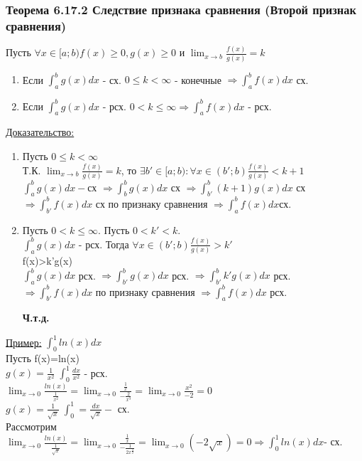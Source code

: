 \documentclass[12pt]{article}
\begin{document}
    \subsubsection*{Теорема 6.17.2 Следствие признака сравнения (Второй признак сравнения)}\label{th:}
    Пусть $\forall x \in [a;b) f(x)\geq 0,g(x)\geq 0$ и $\lim_{x \to b}\frac{f(x)}{g(x)}=k$\par\noindent
    \begin{enumerate}
        \item Если $\int_{a}^{b}g(x)dx$ - сх. $0\leq k< \infty$ - конечные $\Rightarrow \int_{a}^{b}f(x)dx$ сх.
        \item Если $\int_{a}^{b}g(x)dx$ - рсх. $0<k\leq \infty \Rightarrow \int_{a}^{b}f(x)dx$ - рсх.
    \end{enumerate}
    \underline{Доказательство:}
    \begin{adjustwidth}{1.5em}{1.5em}
        \begin{enumerate}
            \item Пусть $0\leq k < \infty$\\
            Т.К. $\lim_{x \to b} \frac{f(x)}{g(x)} = k$, то $\exists b' \in [a;b):\forall x\in (b';b) \frac{f(x)}{g(x)}<{k+1}$\\
            $\int_{a}^{b}g(x)dx - $сх $\Rightarrow \int_{b}^{b}g(x)dx$ сх $\Rightarrow \int_{b'}^{b}(k+1)g(x)dx$ сх $\Rightarrow \int_{b'}^{b}f(x)dx$ сх 
            по признаку сравнения $\Rightarrow \int_{a}^{b}f(x)dx$сх.
            \item Пусть $0<k\leq \infty$. Пусть $0<k'<k$.\\
            $\int_{a}^{b}g(x)dx$ - рсх. Тогда $\forall x \in (b';b) \frac{f(x)}{g(x)}>k'$\\
            f(x)>k'g(x)\\
            $\int_{a}^{b}g(x)dx$ рсх. $\Rightarrow \int_{b'}^{b} g(x)dx$ рсх. $\Rightarrow \int_{b'}^{b} k'g(x)dx$ рсх. $\Rightarrow \int_{b'}^{b}f(x)dx$ по признаку
            сравнения $\Rightarrow \int_{a}^{b}f(x)dx$ рсх. 
            \begin{center}
                \textbf{Ч.т.д.}
            \end{center}
        \end{enumerate}
    \end{adjustwidth}
    \underline{Пример:}  $\int_{0}^{1} ln(x)dx$\\
    Пусть f(x)=ln(x)\\
    $g(x)=\frac{1}{x^2} \; \int_{0}^{1}\frac{dx}{x^2}$ - рсх.\\
    $\lim_{x \to 0}\frac{ln(x)}{\frac{1}{x^2}}=\lim_{x \to 0}\frac{\frac{1}{x}}{-\frac{2}{x^3}}=\lim_{x \to 0}\frac{x^2}{-2}=0$\\
    $g(x)=\frac{1}{\sqrt{x}} \; \int_{0}^{1}=\frac{dx}{\sqrt{x}}-$ сх.\\
    Рассмотрим $\lim_{x \to 0}\frac{ln(x)}{\frac{1}{\sqrt{x}}}=\lim_{x \to 0}\frac{\frac{1}{x}}{-\frac{1}{2x^{\frac{3}{2}}}}=\lim_{x \to 0}(-2\sqrt{x})=0
    \Rightarrow \int_{0}^{1}ln(x)dx$- сх.
\end{document}
